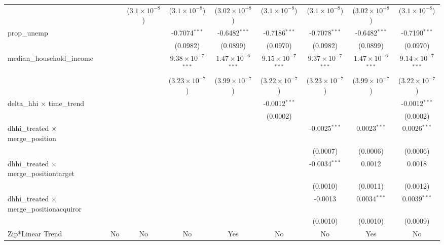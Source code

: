 \begin{table}[H]
{\begin{tabular}{lcccccccc}
   &   & ($3.1\times 10^{-8}$) & ($3.1\times 10^{-8}$) & ($3.02\times 10^{-8}$) & ($3.1\times 10^{-8}$) & ($3.1\times 10^{-8}$) & ($3.02\times 10^{-8}$) & ($3.1\times 10^{-8}$)\\ 

 prop\_unemp&   &    & -0.7074$^{***}$ & -0.6482$^{***}$ & -0.7186$^{***}$ & -0.7078$^{***}$ & -0.6482$^{***}$ & -0.7190$^{***}$\\ 

   &   &    & (0.0982) & (0.0899) & (0.0970) & (0.0982) & (0.0899) & (0.0970)\\ 

 median\_household\_income&   &    & $9.38\times 10^{-7}$$^{***}$ & $1.47\times 10^{-6}$$^{***}$ & $9.15\times 10^{-7}$$^{***}$ & $9.37\times 10^{-7}$$^{***}$ & $1.47\times 10^{-6}$$^{***}$ & $9.14\times 10^{-7}$$^{***}$\\ 

   &   &    & ($3.23\times 10^{-7}$) & ($3.99\times 10^{-7}$) & ($3.22\times 10^{-7}$) & ($3.23\times 10^{-7}$) & ($3.99\times 10^{-7}$) & ($3.22\times 10^{-7}$)\\ 

 delta\_hhi $\times $ time\_trend&   &    &    &    & -0.0012$^{***}$ &    &    & -0.0012$^{***}$\\ 

   &   &    &    &    & (0.0002) &    &    & (0.0002)\\ 

 dhhi\_treated $\times $ merge\_position&   &    &    &    &    & -0.0025$^{***}$ & 0.0023$^{***}$ & 0.0026$^{***}$\\ 

   &   &    &    &    &    & (0.0007) & (0.0006) & (0.0006)\\ 

 dhhi\_treated $\times $ merge\_positiontarget&   &    &    &    &    & -0.0034$^{***}$ & 0.0012 & 0.0018\\ 

   &   &    &    &    &    & (0.0010) & (0.0011) & (0.0012)\\ 

 dhhi\_treated $\times $ merge\_positionacquiror&   &    &    &    &    & -0.0013 & 0.0034$^{***}$ & 0.0039$^{***}$\\ 

   &   &    &    &    &    & (0.0010) & (0.0010) & (0.0009)\\ 

 Zip*Linear Trend & No & No & No & Yes & No & No & Yes & No\\ 


\end{tabular}}
\end{table}
